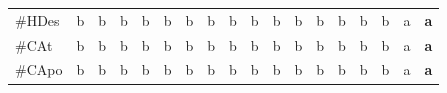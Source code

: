 {\begin{longtable}{lccccccccccccccccc}
\#HDes & \color{grisclaro}b & \color{grisclaro}b & \color{grisclaro}b & \color{grisclaro}b & \color{grisclaro}b & \color{grisclaro}b & \color{grisclaro}b & \color{grisclaro}b & \color{grisclaro}b & \color{grisclaro}b & \color{grisclaro}b & \color{grisclaro}b & \color{grisclaro}b & \color{grisclaro}b & \color{grisclaro}b & a & \textbf{\color{azuldos}a} \\
\#CAt & \color{grisclaro}b & \color{grisclaro}b & \color{grisclaro}b & \color{grisclaro}b & \color{grisclaro}b & \color{grisclaro}b & \color{grisclaro}b & \color{grisclaro}b & \color{grisclaro}b & \color{grisclaro}b & \color{grisclaro}b & \color{grisclaro}b & \color{grisclaro}b & \color{grisclaro}b & \color{grisclaro}b & a & \textbf{\color{azuldos}a} \\
\#CApo & \color{grisclaro}b & \color{grisclaro}b & \color{grisclaro}b & \color{grisclaro}b & \color{grisclaro}b & \color{grisclaro}b & \color{grisclaro}b & \color{grisclaro}b & \color{grisclaro}b & \color{grisclaro}b & \color{grisclaro}b & \color{grisclaro}b & \color{grisclaro}b & \color{grisclaro}b & \color{grisclaro}b & a & \textbf{\color{azuldos}a} \\
\end{longtable}}
